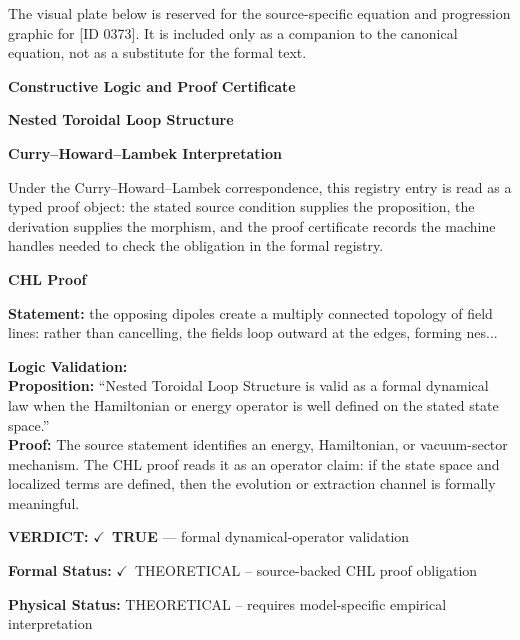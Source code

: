 \begingroup\footnotesize\sloppy
The visual plate below is reserved for the source-specific equation and progression graphic for [ID 0373]. It is included only as a companion to the canonical equation, not as a substitute for the formal text.
\par\endgroup
\ifTZPDarkEdition
{}
\fi

\clearpage
\begingroup\tzpsupportsetup
\noindent\textbf{\fontsize{10.8pt}{12.8pt}\selectfont [ID 0373] Constructive Logic and Proof Certificate}\par
\noindent\textbf{\fontsize{10pt}{12pt}\selectfont Nested Toroidal Loop Structure}\par
\vspace{0.45em}
\begingroup
\footnotesize
\setlength{\parskip}{0.22em}
\setlength{\parindent}{0pt}
\noindent\textbf{Curry--Howard--Lambek Interpretation}\par
Under the Curry--Howard--Lambek correspondence, this registry entry is read as a typed proof
object: the stated source condition supplies the proposition, the derivation supplies the
morphism, and the proof certificate records the machine handles needed to check the obligation
in the formal registry.

\vspace{0.45em}
\noindent\textbf{CHL Proof}\par
\textbf{Statement:} the opposing dipoles create a multiply connected topology of field lines: rather than
cancelling, the fields loop outward at the edges, forming nes...

\textbf{Logic Validation:}\\
\textbf{Proposition:} ``Nested Toroidal Loop Structure is valid as a formal dynamical law when the Hamiltonian
or energy operator is well defined on the stated state space.''\\
\textbf{Proof:} The source statement identifies an energy, Hamiltonian, or vacuum-sector mechanism. The
CHL proof reads it as an operator claim: if the state space and localized terms are
defined, then the evolution or extraction channel is formally meaningful.

\textbf{VERDICT:} \ensuremath{\checkmark}\ \textbf{TRUE} --- formal dynamical-operator validation

\textbf{Formal Status:} \ensuremath{\checkmark}\ THEORETICAL -- source-backed CHL proof obligation

\textbf{Physical Status:} THEORETICAL -- requires model-specific empirical interpretation
\par\vspace{0.45em}
\par
\ifTZPDarkEdition
{}
\fi
\endgroup
\endgroup

